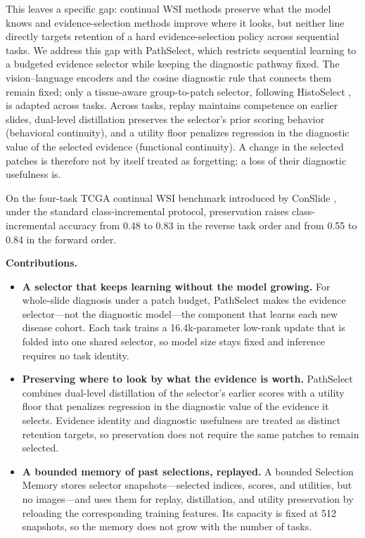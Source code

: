 \documentclass{article}
\begin{document}
This leaves a specific gap: continual WSI methods preserve what the model knows and evidence-selection methods improve where it looks, but neither line directly targets retention of a hard evidence-selection policy across sequential tasks. We address this gap with PathSelect, which restricts sequential learning to a budgeted evidence selector while keeping the diagnostic pathway fixed. The vision--language encoders and the cosine diagnostic rule that connects them remain fixed; only a tissue-aware group-to-patch selector, following HistoSelect \cite{huang2026histoselect}, is adapted across tasks. Across tasks, replay maintains competence on earlier slides, dual-level distillation preserves the selector's prior scoring behavior (behavioral continuity), and a utility floor penalizes regression in the diagnostic value of the selected evidence (functional continuity). A change in the selected patches is therefore not by itself treated as forgetting; a loss of their diagnostic usefulness is.

On the four-task TCGA continual WSI benchmark introduced by ConSlide \cite{huang2023conslide}, under the standard class-incremental protocol, preservation raises class-incremental accuracy from 0.48 to 0.83 in the reverse task order and from 0.55 to 0.84 in the forward order.

\textbf{Contributions.}
\begin{itemize}
    \item \textbf{A selector that keeps learning without the model growing.} For whole-slide diagnosis under a patch budget, PathSelect makes the evidence selector---not the diagnostic model---the component that learns each new disease cohort. Each task trains a 16.4k-parameter low-rank update that is folded into one shared selector, so model size stays fixed and inference requires no task identity.
    \item \textbf{Preserving where to look by what the evidence is worth.} PathSelect combines dual-level distillation of the selector's earlier scores with a utility floor that penalizes regression in the diagnostic value of the evidence it selects. Evidence identity and diagnostic usefulness are treated as distinct retention targets, so preservation does not require the same patches to remain selected.
    \item \textbf{A bounded memory of past selections, replayed.} A bounded Selection Memory stores selector snapshots---selected indices, scores, and utilities, but no images---and uses them for replay, distillation, and utility preservation by reloading the corresponding training features. Its capacity is fixed at 512 snapshots, so the memory does not grow with the number of tasks.
\end{itemize}
\end{document}
